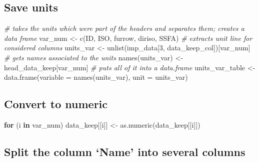 \documentclass[
]{article}
\newenvironment{Shaded}{\begin{snugshade}}{\end{snugshade}}
\newcommand{\AttributeTok}[1]{\textcolor[rgb]{0.77,0.63,0.00}{#1}}
\newcommand{\CommentTok}[1]{\textcolor[rgb]{0.56,0.35,0.01}{\textit{#1}}}
\newcommand{\ControlFlowTok}[1]{\textcolor[rgb]{0.13,0.29,0.53}{\textbf{#1}}}
\newcommand{\DecValTok}[1]{\textcolor[rgb]{0.00,0.00,0.81}{#1}}
\newcommand{\FunctionTok}[1]{\textcolor[rgb]{0.00,0.00,0.00}{#1}}
\newcommand{\NormalTok}[1]{#1}
\newcommand{\OtherTok}[1]{\textcolor[rgb]{0.56,0.35,0.01}{#1}}
\begin{document}
\hypertarget{save-units}{%
\subsection{Save units}\label{save-units}}

\begin{Shaded}
\begin{Highlighting}[]
\CommentTok{\# takes the units which were part of the headers and separates them; creates a data frame}
\NormalTok{var\_num }\OtherTok{\textless{}{-}} \FunctionTok{c}\NormalTok{(ID, ISO, furrow, diriso, SSFA)}
\CommentTok{\# extracts \textquotesingle{}unit\textquotesingle{} line for considered columns}
\NormalTok{units\_var }\OtherTok{\textless{}{-}} \FunctionTok{unlist}\NormalTok{(imp\_data[}\DecValTok{3}\NormalTok{, data\_keep\_col])[var\_num] }
\CommentTok{\# gets names associated to the units}
\FunctionTok{names}\NormalTok{(units\_var) }\OtherTok{\textless{}{-}}\NormalTok{ head\_data\_keep[var\_num] }
\CommentTok{\# puts all of it into a data.frame}
\NormalTok{units\_var\_table }\OtherTok{\textless{}{-}} \FunctionTok{data.frame}\NormalTok{(}\AttributeTok{variable =} \FunctionTok{names}\NormalTok{(units\_var), }\AttributeTok{unit =}\NormalTok{ units\_var) }
\end{Highlighting}
\end{Shaded}

\hypertarget{convert-to-numeric}{%
\subsection{Convert to numeric}\label{convert-to-numeric}}

\begin{Shaded}
\begin{Highlighting}[]
\ControlFlowTok{for}\NormalTok{ (i }\ControlFlowTok{in}\NormalTok{ var\_num) data\_keep[[i]] }\OtherTok{\textless{}{-}} \FunctionTok{as.numeric}\NormalTok{(data\_keep[[i]])}
\end{Highlighting}
\end{Shaded}

\hypertarget{split-the-column-name-into-several-columns}{%
\subsection{Split the column `Name' into several
columns}\label{split-the-column-name-into-several-columns}}
\end{document}
